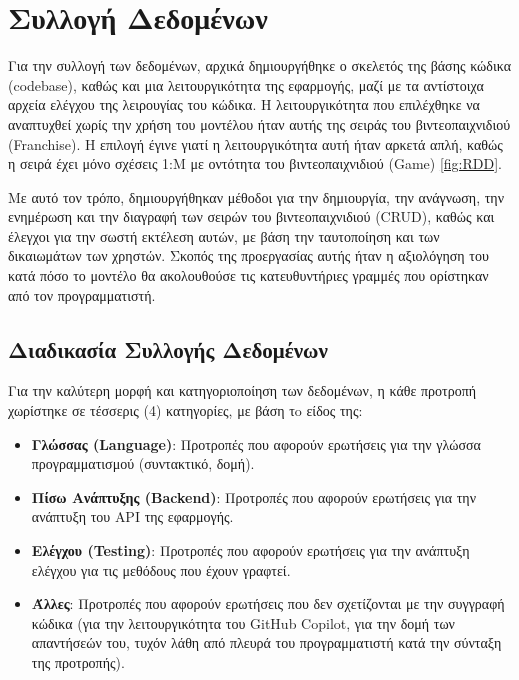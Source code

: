 \section{Συλλογή Δεδομένων}

Για την συλλογή των δεδομένων, αρχικά δημιουργήθηκε ο σκελετός της βάσης
κώδικα \textlatin{(codebase)}, καθώς και μια λειτουργικότητα της
εφαρμογής, μαζί με τα αντίστοιχα αρχεία ελέγχου της λειρουγίας του
κώδικα. Η λειτουργικότητα που επιλέχθηκε να αναπτυχθεί χωρίς την χρήση
του μοντέλου ήταν αυτής της σειράς του βιντεοπαιχνιδιού
\textlatin{(Franchise)}. Η επιλογή έγινε γιατί η λειτουργικότητα αυτή
ήταν αρκετά απλή, καθώς η σειρά έχει μόνο σχέσεις 1:Μ με οντότητα του
βιντεοπαιχνιδιού \textlatin{(Game)} \ref{fig:RDD}.

Με αυτό τον τρόπο, δημιουργήθηκαν μέθοδοι για την δημιουργία, την
ανάγνωση, την ενημέρωση και την διαγραφή των σειρών του βιντεοπαιχνιδιού
\textlatin{(CRUD)}, καθώς και έλεγχοι για την σωστή εκτέλεση αυτών, με
βάση την ταυτοποίηση και των δικαιωμάτων των χρηστών. Σκοπός της
προεργασίας αυτής ήταν η αξιολόγηση του κατά πόσο το μοντέλο θα
ακολουθούσε τις κατευθυντήριες γραμμές που ορίστηκαν από τον
προγραμματιστή.

\subsection{Διαδικασία Συλλογής Δεδομένων}

Για την καλύτερη μορφή και κατηγοριοποίηση των δεδομένων, η κάθε
προτροπή χωρίστηκε σε τέσσερις (4) κατηγορίες, με βάση τo είδος της:

\begin{itemize}
\item
  \textbf{Γλώσσας (\textlatin{Language})}: Προτροπές που αφορούν
  ερωτήσεις για την γλώσσα προγραμματισμού (συντακτικό, δομή).
\item
  \textbf{Πίσω Ανάπτυξης (\textlatin{Backend})}: Προτροπές που αφορούν
  ερωτήσεις για την ανάπτυξη του \textlatin{API} της εφαρμογής.
\item
  \textbf{Ελέγχου (\textlatin{Testing})}: Προτροπές που αφορούν
  ερωτήσεις για την ανάπτυξη ελέγχου για τις μεθόδους που έχουν γραφτεί.
\item
  \textbf{Άλλες}: Προτροπές που αφορούν ερωτήσεις που δεν σχετίζονται με
  την συγγραφή κώδικα (για την λειτουργικότητα του \textlatin{GitHub
    Copilot}, για την δομή των απαντήσεών του, τυχόν λάθη από πλευρά του
  προγραμματιστή κατά την σύνταξη της προτροπής).
\end{itemize}

